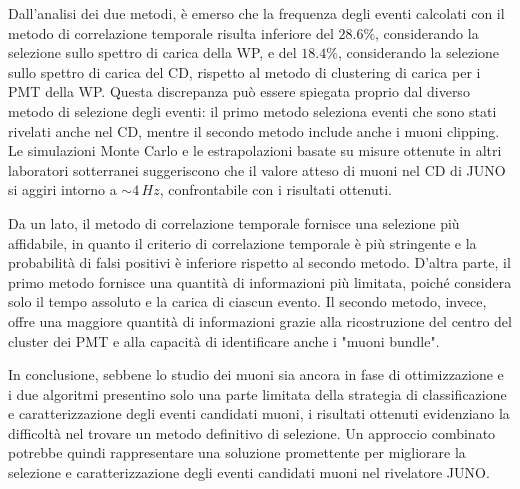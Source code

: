 Dall'analisi dei due metodi, è emerso che la frequenza degli eventi calcolati con il metodo di correlazione temporale risulta inferiore del $28.6\%$, considerando la selezione sullo spettro di carica della WP, e del $18.4\%$, considerando la selezione sullo spettro di carica del CD, rispetto al metodo di clustering di carica per i PMT della WP. Questa discrepanza può essere spiegata proprio dal diverso metodo di selezione degli eventi: il primo metodo seleziona eventi che sono stati rivelati anche nel CD, mentre il secondo metodo include anche i muoni clipping. Le simulazioni Monte Carlo e le estrapolazioni basate su misure ottenute in altri laboratori sotterranei suggeriscono che il valore atteso di muoni nel CD di JUNO si aggiri intorno a $\sim4\,\unit{Hz}$, confrontabile con i risultati ottenuti.

Da un lato, il metodo di correlazione temporale fornisce una selezione più affidabile, in quanto il criterio di correlazione temporale è più stringente e la probabilità di falsi positivi è inferiore rispetto al secondo metodo. D'altra parte, il primo metodo fornisce una quantità di informazioni più limitata, poiché considera solo il tempo assoluto e la carica di ciascun evento. Il secondo metodo, invece, offre una maggiore quantità di informazioni grazie alla ricostruzione del centro del cluster dei PMT e alla capacità di identificare anche i "muoni bundle".

In conclusione, sebbene lo studio dei muoni sia ancora in fase di ottimizzazione e i due algoritmi presentino solo una parte limitata della strategia di classificazione e caratterizzazione degli eventi candidati muoni, i risultati ottenuti evidenziano la difficoltà nel trovare un metodo definitivo di selezione. Un approccio combinato potrebbe quindi rappresentare una soluzione promettente per migliorare la selezione e caratterizzazione degli eventi candidati muoni nel rivelatore JUNO.
